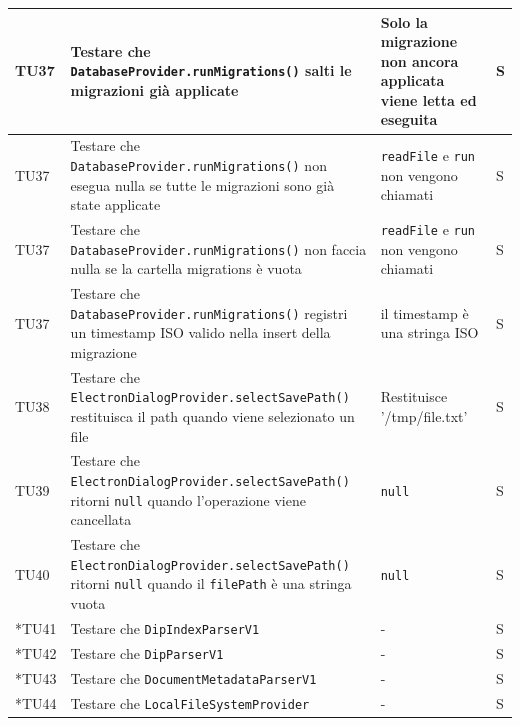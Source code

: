 \documentclass[a4paper,12pt]{article}
\begin{document}
\begin{longtable}{|M{1.2cm}|M{5cm}|M{5cm}|M{1.5cm}|}
            TU37 & Testare che \texttt{DatabaseProvider.runMigrations()} salti le migrazioni già applicate & Solo la migrazione non ancora applicata viene letta ed eseguita & S \\
            \hline

            TU37 & Testare che \texttt{DatabaseProvider.runMigrations()} non esegua nulla se tutte le migrazioni sono già state applicate & \texttt{readFile} e \texttt{run} non vengono chiamati & S \\
            \hline

            TU37 & Testare che \texttt{DatabaseProvider.runMigrations()} non faccia nulla se la cartella migrations è vuota & \texttt{readFile} e \texttt{run} non vengono chiamati & S \\
            \hline

            TU37 & Testare che \texttt{DatabaseProvider.runMigrations()} registri un timestamp ISO valido nella insert della migrazione & il timestamp è una stringa ISO & S \\
            \hline

            TU38 & Testare che \texttt{ElectronDialogProvider.selectSavePath()} restituisca il path quando viene selezionato un file & Restituisce '/tmp/file.txt' & S \\
            \hline

            TU39 & Testare che \texttt{ElectronDialogProvider.selectSavePath()} ritorni \texttt{null} quando l'operazione viene cancellata & \texttt{null} & S \\
            \hline

            TU40 & Testare che \texttt{ElectronDialogProvider.selectSavePath()} ritorni \texttt{null} quando il \texttt{filePath} è una stringa vuota & \texttt{null} & S \\
            \hline

            *TU41 & Testare che \texttt{DipIndexParserV1} & - & S \\
            \hline

            *TU42 & Testare che \texttt{DipParserV1} & - & S \\
            \hline

            *TU43 & Testare che \texttt{DocumentMetadataParserV1} & - & S \\
            \hline

            *TU44 & Testare che \texttt{LocalFileSystemProvider} & - & S \\
            \hline


\end{longtable}
\end{document}
